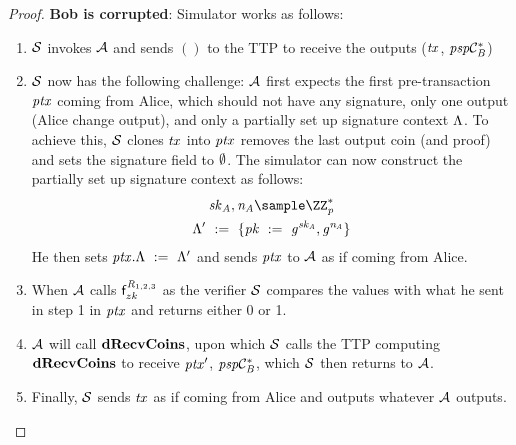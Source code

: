 \begin{proof}
    \textbf{Bob is corrupted}: Simulator works as follows:
    \begin{enumerate}
        \item $\mathcal{S}$ invokes $\mathcal{A}$ and sends $()$ to the TTP to receive the outputs ($\mathit{tx}$, $\mathit{psp}\mathcal{C}_{\mathit{B}}^*$)
        \item $\mathcal{S}$ now has the following challenge: $\mathcal{A}$ first expects the first pre-transaction $\mathit{ptx}$ coming from Alice, which should not have any signature, only one output (Alice change output), and only a partially set up signature context $\Lambda$.
        To achieve this, $\mathcal{S}$ clones $\mathit{tx}$ into $\mathit{ptx}$ removes the last output coin (and proof) and sets the signature field to $\emptyset$.
        The simulator can now construct the partially set up signature context as follows:
        \begin{gather*}
            \varSecKeyAlice, \varNonceAlice \sample \cnstIntegersPrimeWithoutZero{\varPrime} \\
            \funStarAlt{\varSigContext} \opAssign \{ \varPubKey \opAssign \funGen{\varSecKeyAlice}, \funGen{\varNonceAlice} \}
        \end{gather*}
        He then sets $\mathit{ptx}.\Lambda ~:=~ {\Lambda}'$ and sends $\mathit{ptx}$ to $\mathcal{A}$ as if coming from Alice.
        \item When $\mathcal{A}$ calls $\mathsf{f}^{\mathit{R}_{1,2,3}}_{zk}$ as the verifier $\mathcal{S}$ compares the values with what he sent in step 1 in $\mathit{ptx}$ and returns either 0 or 1.
        \item $\mathcal{A}$ will call $\mathbf{dRecvCoins}$, upon which $\mathcal{S}$ calls the TTP computing $\mathbf{dRecvCoins}$ to receive ${\mathit{ptx}}'$, $\mathit{psp}\mathcal{C}_{\mathit{B}}^*$, which $\mathcal{S}$ then returns to $\mathcal{A}$.
        \item Finally, $\mathcal{S}$ sends $\mathit{tx}$ as if coming from Alice and outputs whatever $\mathcal{A}$ outputs.
    \end{enumerate}


\end{proof}
